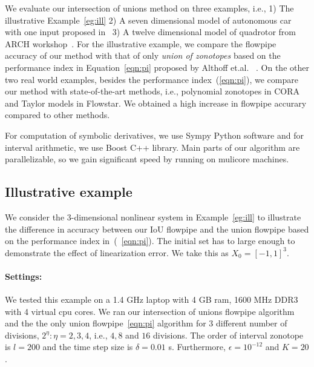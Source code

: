 We evaluate our intersection of unions method on three examples, i.e.,
1) The illustrative Example~\ref{eg:ill} 2) A seven dimensional model
of autonomous car with one input proposed in~ 3) A twelve dimensional
model of quadrotor from ARCH workshop~.  For the illustrative example,
we compare the flowpipe accuracy of our method with that of only
\emph{union of zonotopes} based on the performance index in
Equation~\ref{eqn:pi} proposed by Althoff
et.al.~\cite{althoff2008reachability} .  On the other two real world
examples, besides the performance index~(\ref{eqn:pi}), we compare our
method with state-of-the-art methods, i.e., polynomial
zonotopes in CORA and Taylor models in Flowstar.  We obtained a high
increase in flowpipe accurary compared to other methods.

For computation of symbolic derivatives, we use Sympy Python software and for
interval arithmetic, we use Boost C++ library.  Main parts of
our algorithm are parallelizable, so we gain significant speed by
running on mulicore machines.

\subsection{Illustrative example}
We consider the 3-dimensional nonlinear system in Example~\ref{eg:ill}
to illustrate the difference in accuracy between our IoU flowpipe and
the union flowpipe based on the performance index
in~\cite{althoff2008reachability}(~\ref{eqn:pi}).  The initial set has
to large enough to demonstrate the effect of linearization error.  We
take this as $X_0 = [-1,1]^3$.
\paragraph{Settings:}  We tested this example on a 1.4 GHz
laptop with 4 GB ram, 1600 MHz DDR3 with 4 virtual cpu cores.  We ran
our intersection of unions flowpipe algorithm and the the only union
flowpipe~\ref{eqn:pi} algorithm for 3 different number of divisions,
$2^\eta:\eta = 2, 3,4$, i.e., $4, 8$ and $16$ divisions. The order of
interval zonotope is $l = 200$ and the time step size is $\delta =
0.01$ s.  Furthermore, $\epsilon = 10^{-12}$ and $K = 20$.

